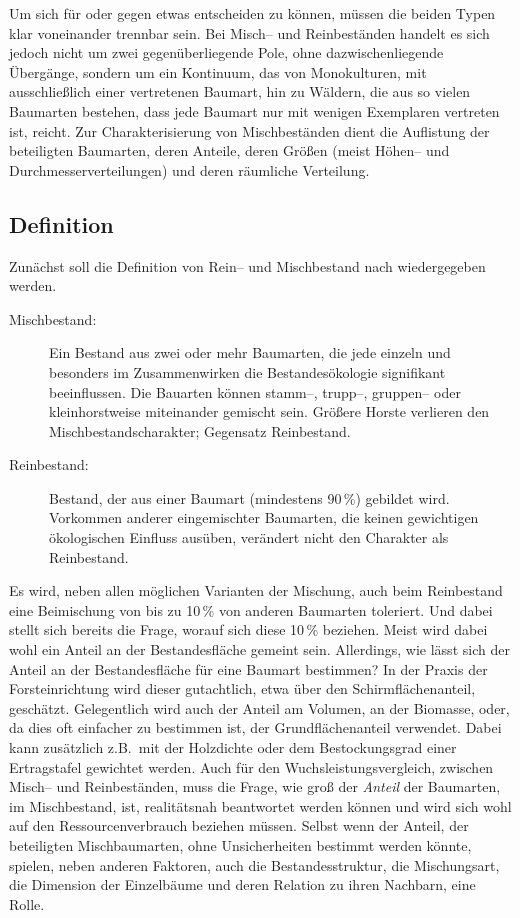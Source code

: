 \documentclass[twocolumn]{scrartcl}
\begin{document}
Um sich für oder gegen etwas entscheiden zu können, müssen die beiden Typen klar
voneinander trennbar sein. Bei Misch-- und Reinbeständen handelt es sich jedoch
nicht um zwei gegenüberliegende Pole, ohne dazwischenliegende Übergänge, sondern
um ein Kontinuum, das von Monokulturen, mit ausschließlich einer vertretenen
Baumart, hin zu Wäldern, die aus so vielen Baumarten bestehen, dass jede Baumart
nur mit wenigen Exemplaren vertreten ist, reicht. Zur Charakterisierung von
Mischbeständen dient die Auflistung der beteiligten Baumarten, deren Anteile,
deren Größen (meist Höhen-- und Durchmesserverteilungen) und deren räumliche Verteilung.

\subsection{Definition}
\label{ssec:definition}

Zunächst soll die Definition von Rein-- und Mischbestand nach
\cite{bruenig1980WaldbaulicheTerminologi} wiedergegeben werden.
\begin{description}
\item[Mischbestand:] Ein Bestand aus zwei oder
  mehr Baumarten, die jede einzeln und besonders im Zusammenwirken die
  Bestandesökologie signifikant beeinflussen. Die Bauarten können stamm--,
  trupp--, gruppen-- oder kleinhorstweise miteinander gemischt sein. Größere
  Horste verlieren den Mischbestandscharakter; Gegensatz Reinbestand.
\item[Reinbestand:] Bestand, der aus einer
  Baumart (mindestens 90\,\%) gebildet wird. Vorkommen anderer eingemischter
  Baumarten, die keinen gewichtigen ökologischen Einfluss ausüben, verändert
  nicht den Charakter als Reinbestand.
\end{description}

Es wird, neben allen möglichen Varianten der Mischung, auch beim Reinbestand
eine Beimischung von bis zu 10\,\% von anderen Baumarten toleriert. Und dabei
stellt sich bereits die Frage, worauf sich diese 10\,\% beziehen. Meist wird
dabei wohl ein Anteil an der Bestandesfläche gemeint sein. Allerdings, wie lässt
sich der Anteil an der Bestandesfläche für eine Baumart bestimmen? In der Praxis
der Forsteinrichtung wird dieser gutachtlich, etwa über den Schirmflächenanteil,
geschätzt. Gelegentlich wird auch der Anteil am Volumen, an der Biomasse, oder,
da dies oft einfacher zu bestimmen ist, der Grundflächenanteil verwendet. Dabei
kann zusätzlich z.B.\ mit der Holzdichte oder dem Bestockungsgrad einer
Ertragstafel gewichtet werden. Auch für den Wuchsleistungsvergleich, zwischen
Misch-- und Reinbeständen, muss die Frage, wie groß der \emph{Anteil} der
Baumarten, im Mischbestand, ist, realitätsnah beantwortet werden können und wird
sich wohl auf den Ressourcenverbrauch beziehen müssen. Selbst wenn der Anteil,
der beteiligten Mischbaumarten, ohne Unsicherheiten bestimmt werden könnte,
spielen, neben anderen Faktoren, auch die Bestandesstruktur, die Mischungsart,
die Dimension der Einzelbäume und deren Relation zu ihren Nachbarn, eine Rolle.
\end{document}
